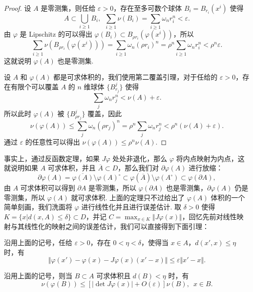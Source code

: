 \begin{proof}
    设 $A$ 是零测集，则任给 $\varepsilon > 0$，存在至多可数个球体 $B_i = B_{r_i}(x^i)$ 使得 \[A\subset \displaystyle\bigcup_{i\geqslant 1}B_i,\enspace \sum_{i\geqslant 1}\nu(B_i) = \sum_{i\geqslant 1}\omega_n r_i^n < \varepsilon.\]
    由 $\varphi$ 是 Lipschitz 的可以得出 $\varphi(B_i) \subset B_{\rho r_i}(\varphi(x^i))$，所以 \[\sum_{i\geqslant 1}\nu(B_{\rho r_i}(\varphi(x^i))) = \sum_{i\geqslant 1}\omega_n (\rho r_i)^n = \rho^n\sum_{i\geqslant 1}\omega_n r_i^n < \rho^n\varepsilon.\]
    这就说明 $\varphi(A)$ 也是零测集.

    设 $A$ 和 $\varphi(A)$ 都是可求体积的，我们使用第二覆盖引理，对于任给的 $\varepsilon > 0$，存在有限个可以覆盖 $A$ 的 $n$ 维球体 $\{B_{r_j}^j\}$ 使得 \[\sum_j\omega_n r_j^n < \nu(A) + \varepsilon.\]
    所以此时 $\varphi(A)$ 被 $\{B_{\rho r_j}^j\}$ 覆盖，因此 \[\nu(\varphi(A))\leqslant \sum_{j}\omega_n (\rho r_j)^n = \rho^n\sum_j\omega_n r_j^n < \rho^n(\nu(A) + \varepsilon).\]
    通过 $\varepsilon$ 的任意性可以得出 $\nu(\varphi(A)) \leqslant \rho^n\nu(A)$.
\end{proof}

事实上，通过反函数定理，如果 $J\varphi$ 处处非退化，那么 $\varphi$ 将内点映射为内点，这就说明如果 $A$ 可求体积，并且 $\overline{A}\subset D$，那么我们对 $\partial \varphi(A)$ 进行放缩：\[\partial \varphi(A) = \overline{\varphi(A)}\setminus \varphi(A)^{\circ} \subset \varphi(\overline{A})\setminus \varphi(A^{\circ}) \subset \varphi(\partial A),\]
由 $A$ 可求体积可以得到 $\partial A$ 是零测集，所以 $\varphi(\partial A)$ 也是零测集，$\partial \varphi(A)$ 仍是零测集，所以 $\varphi(A)$ 就可求体积. 上面的定理只不过给出了 $\varphi(A)$ 体积的一个简单刻画，我们洗面将 $\varphi$ 进行线性化并且进行误差估计. 取 $\delta > 0$ 使得 $K = \{x\vert d(x, A) \leqslant \delta\} \subset D$，并记 $C = \max_{x\in K}\Vert J\varphi(x)\Vert$，回忆先前对线性映射与其线性化的映射之间的误差估计，我们可以直接得到下面引理：

\begin{lemma}{}{}
    沿用上面的记号，任给 $\varepsilon >0$，存在 $0<\eta <\delta$，使得当 $x\in A$，$d(x', x)\leqslant \eta$ 时，有 \[\Vert \varphi(x') - \varphi(x) - J\varphi(x)(x' - x)\Vert\leqslant \varepsilon\Vert x' - x\Vert.\]
\end{lemma}

\begin{lemma}{}{}
    沿用上面的记号，则当 $B\subset A$ 可求体积且 $d(B) < \eta$ 时，有 \[\nu(\varphi(B)) \leqslant \left[\vert \det J\varphi(x)\vert + O(\varepsilon)\right]\nu(B),\enspace x\in B.\]
\end{lemma}

